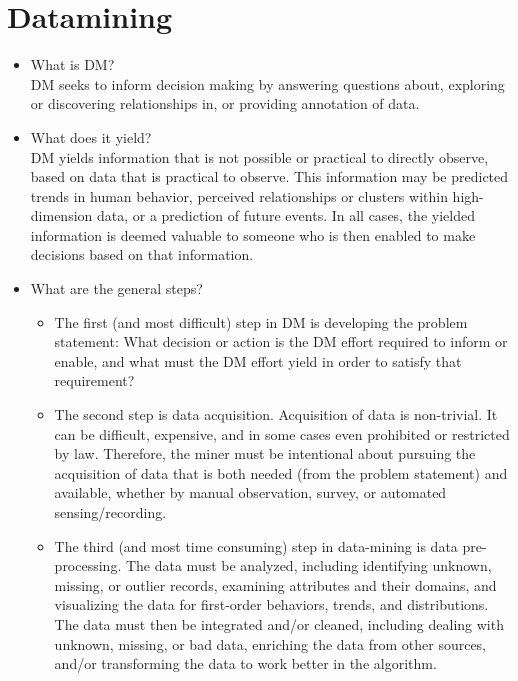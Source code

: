\documentclass[fleqn,10pt]{SelfArx} %
\begin{document}
\section{Datamining}

\begin{itemize}[noitemsep]

\item What is DM?\\
DM seeks to inform decision making by answering questions about, exploring or discovering relationships in, or providing annotation of data.

\item What does it yield?\\
  DM yields information that is not possible or practical to directly observe, based on data that is practical to observe.  This information may be predicted trends in human behavior, perceived relationships or clusters within high-dimension data, or a prediction of future events.  In all cases, the yielded information is deemed valuable to someone who is then enabled to make decisions based on that information.

\item What are the general steps?  

\begin{itemize}
	
	\item The first (and most difficult) step in DM is developing the problem statement: What decision or action is the DM effort required to inform or enable, and what must the DM effort yield in order to satisfy that requirement?
	
	\item The second step is data acquisition.  Acquisition of data is non-trivial.  It can be difficult, expensive, and in some cases even prohibited or restricted by law.  Therefore, the miner must be intentional about pursuing the acquisition of data that is both needed (from the problem statement) and available, whether by manual observation, survey, or automated sensing/recording.
	
	\item The third (and most time consuming) step in data-mining is data pre-processing.  The data must be analyzed, including identifying unknown, missing, or outlier records, examining attributes and their domains, and visualizing the data for first-order behaviors, trends, and distributions.  The data must then be integrated and/or cleaned, including dealing with unknown, missing, or bad data, enriching the data from other sources, and/or transforming the data to work better in the algorithm.
	

\end{itemize}
\end{itemize}
\end{document}
